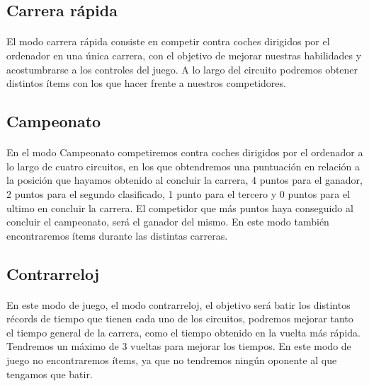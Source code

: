 \subsection{Carrera rápida}

\paragraph{}
El modo carrera rápida consiste en competir contra coches dirigidos por el ordenador en una única carrera, con el objetivo de 
mejorar nuestras habilidades y acostumbrarse a los controles del juego. A lo largo del circuito podremos obtener distintos
ítems con los que hacer frente a nuestros competidores.

\subsection{Campeonato}

\paragraph{}
En el modo Campeonato competiremos contra coches dirigidos por el ordenador a lo largo de cuatro circuitos, en los que obtendremos
una puntuación en relación a la posición que hayamos obtenido al concluir la carrera, 4 puntos para el ganador, 2 puntos para
el segundo clasificado, 1 punto para el tercero y 0 puntos para el ultimo en concluir la carrera. El competidor que más puntos haya 
conseguido al concluir el campeonato, será el ganador del mismo. En este modo
también encontraremos ítems durante las distintas carreras.

\subsection{Contrarreloj}

\paragraph{}
En este modo de juego, el modo contrarreloj, el objetivo será batir los
distintos récords de tiempo que tienen cada uno de los 
circuitos, podremos mejorar tanto el tiempo general de la carrera, como el tiempo obtenido en la vuelta más rápida. Tendremos
un máximo de 3 vueltas para mejorar los tiempos. En este modo de juego no
encontraremos ítems, ya que no tendremos ningún oponente
al que tengamos que batir.


